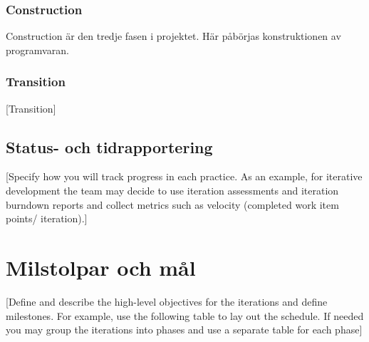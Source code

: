 \subsubsection*{Construction}
Construction är den tredje fasen i projektet. Här påbörjas konstruktionen av programvaran.

\subsubsection*{Transition}
[Transition]

\subsection{Status- och tidrapportering}
[Specify how you will track progress in each practice. As an example, for iterative development the team may decide to use iteration assessments and iteration burndown reports and collect metrics such as velocity (completed work item points/ iteration).]

\section{Milstolpar och mål}
[Define and describe the high-level objectives for the iterations and define milestones. For example, use the following table to lay out the schedule. If needed you may group the iterations into phases and use a separate table for each phase]

